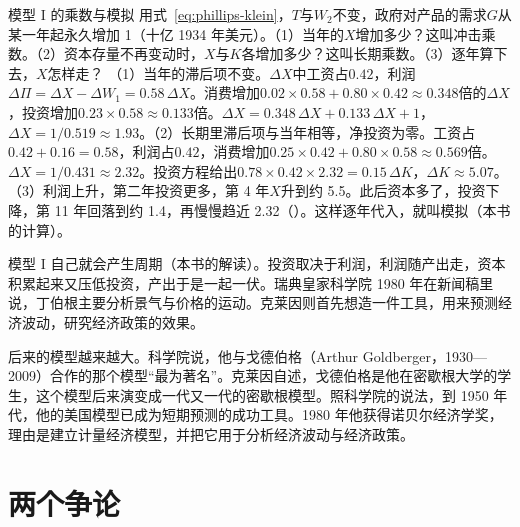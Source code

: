 \begin{example}{模型 I 的乘数与模拟}\label{ex:phillips-klein}
用式~\eqref{eq:phillips-klein}，$T$与$W_2$不变，政府对产品的需求$G$从某一年起永久增加 1（十亿 1934 年美元）。（1）当年的$X$增加多少？这叫冲击乘数。（2）资本存量不再变动时，$X$与$K$各增加多少？这叫长期乘数。（3）逐年算下去，$X$怎样走？
\solution
（1）当年的滞后项不变。$\Delta X$中工资占$0.42$，利润$\Delta\Pi=\Delta X-\Delta W_1=0.58\,\Delta X$。消费增加$0.02\times0.58+0.80\times0.42\approx0.348$倍的$\Delta X$，投资增加$0.23\times0.58\approx0.133$倍。$\Delta X=0.348\,\Delta X+0.133\,\Delta X+1$，$\Delta X=1/0.519\approx1.93$。（2）长期里滞后项与当年相等，净投资为零。工资占$0.42+0.16=0.58$，利润占$0.42$，消费增加$0.25\times0.42+0.80\times0.58\approx0.569$倍。$\Delta X=1/0.431\approx2.32$。投资方程给出$0.78\times0.42\times2.32=0.15\,\Delta K$，$\Delta K\approx5.07$。（3）利润上升，第二年投资更多，第 4 年$X$升到约 5.5。此后资本多了，投资下降，第 11 年回落到约 1.4，再慢慢趋近 2.32（）。这样逐年代入，就叫模拟（本书的计算）。
\end{example}


模型 I 自己就会产生周期（本书的解读）。投资取决于利润，利润随产出走，资本积累起来又压低投资，产出于是一起一伏。瑞典皇家科学院 1980 年在新闻稿里说，丁伯根主要分析景气与价格的运动\cite{nobel1980}。克莱因则首先想造一件工具，用来预测经济波动，研究经济政策的效果\cite{nobel1980}。

后来的模型越来越大。科学院说，他与戈德伯格（Arthur Goldberger，1930—2009）合作的那个模型“最为著名”\cite{nobel1980,gnd38}。克莱因自述，戈德伯格是他在密歇根大学的学生，这个模型后来演变成一代又一代的密歇根模型\cite{nobel1980bio}。照科学院的说法，到 1950 年代，他的美国模型已成为短期预测的成功工具\cite{nobel1980}。1980 年他获得诺贝尔经济学奖，理由是建立计量经济模型，并把它用于分析经济波动与经济政策\cite{nobel1980}。

\section{两个争论}\label{sec:phillips-debate}

